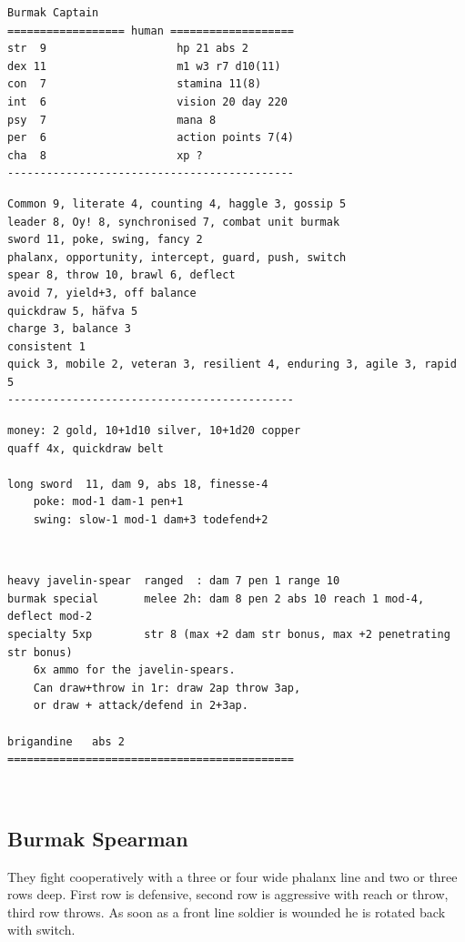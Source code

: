 \goodbreak \small \begin{samepage} \begin{verbatim}
Burmak Captain
================== human ===================
str  9                    hp 21 abs 2
dex 11                    m1 w3 r7 d10(11)
con  7                    stamina 11(8)
int  6                    vision 20 day 220
psy  7                    mana 8
per  6                    action points 7(4)
cha  8                    xp ?
--------------------------------------------
\end{verbatim} \goodbreak \begin{verbatim}
Common 9, literate 4, counting 4, haggle 3, gossip 5
leader 8, Oy! 8, synchronised 7, combat unit burmak
sword 11, poke, swing, fancy 2
phalanx, opportunity, intercept, guard, push, switch
spear 8, throw 10, brawl 6, deflect
avoid 7, yield+3, off balance
quickdraw 5, häfva 5
charge 3, balance 3
consistent 1
quick 3, mobile 2, veteran 3, resilient 4, enduring 3, agile 3, rapid 5
--------------------------------------------
\end{verbatim} \goodbreak \begin{verbatim}
money: 2 gold, 10+1d10 silver, 10+1d20 copper
quaff 4x, quickdraw belt

long sword  11, dam 9, abs 18, finesse-4
    poke: mod-1 dam-1 pen+1
    swing: slow-1 mod-1 dam+3 todefend+2
\end{verbatim} \end{samepage}   \   \goodbreak \begin{samepage} \begin{verbatim}
heavy javelin-spear  ranged  : dam 7 pen 1 range 10
burmak special       melee 2h: dam 8 pen 2 abs 10 reach 1 mod-4, deflect mod-2
specialty 5xp        str 8 (max +2 dam str bonus, max +2 penetrating str bonus)
    6x ammo for the javelin-spears. 
    Can draw+throw in 1r: draw 2ap throw 3ap, 
    or draw + attack/defend in 2+3ap.

brigandine   abs 2
============================================
\end{verbatim} \end{samepage} \normalsize

\


\subsection*{Burmak Spearman}

They fight cooperatively with a three or four wide phalanx line and two or three rows deep. First row is defensive, second row is aggressive with reach or throw, third row throws. As soon as a front line soldier is wounded he is rotated back with switch.

